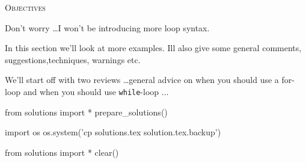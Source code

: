 
\textsc{Objectives}

Don't worry \ldots I won't be
introducing more loop syntax.

In this section we'll look at more examples.
Ill also give some general comments, suggestions,techniques, warnings etc.

We'll start off with two reviews \ldots general advice
on when you should use a for-loop and when you should use \texttt{while}-loop ...














\begin{python0}
from solutions import *
prepare_solutions()
\end{python0}
\begin{python}
import os
os.system('cp solutions.tex solution.tex.backup')  
\end{python}

\begin{python0}
from solutions import *
clear()
\end{python0}
